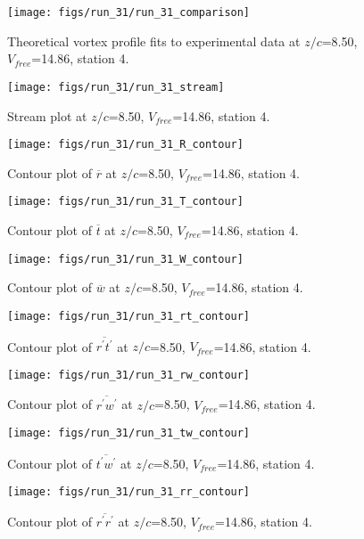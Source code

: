 \begin{figure}[H]
\centering
\texttt{[image: figs/run\_31/run\_31\_comparison]}
\caption{Theoretical vortex profile fits to experimental data at $z/c$=8.50, $V_{free}$=14.86, station 4.}
\end{figure}


\begin{figure}[H]
\centering
\texttt{[image: figs/run\_31/run\_31\_stream]}
\caption{Stream plot at $z/c$=8.50, $V_{free}$=14.86, station 4.}
\end{figure}


\begin{figure}[H]
\centering
\texttt{[image: figs/run\_31/run\_31\_R\_contour]}
\caption{Contour plot of $\overline{r}$ at $z/c$=8.50, $V_{free}$=14.86, station 4.}
\end{figure}


\begin{figure}[H]
\centering
\texttt{[image: figs/run\_31/run\_31\_T\_contour]}
\caption{Contour plot of $\overline{t}$ at $z/c$=8.50, $V_{free}$=14.86, station 4.}
\end{figure}


\begin{figure}[H]
\centering
\texttt{[image: figs/run\_31/run\_31\_W\_contour]}
\caption{Contour plot of $\overline{w}$ at $z/c$=8.50, $V_{free}$=14.86, station 4.}
\end{figure}


\begin{figure}[H]
\centering
\texttt{[image: figs/run\_31/run\_31\_rt\_contour]}
\caption{Contour plot of $\overline{r^\prime t^\prime}$ at $z/c$=8.50, $V_{free}$=14.86, station 4.}
\end{figure}


\begin{figure}[H]
\centering
\texttt{[image: figs/run\_31/run\_31\_rw\_contour]}
\caption{Contour plot of $\overline{r^\prime w^\prime}$ at $z/c$=8.50, $V_{free}$=14.86, station 4.}
\end{figure}


\begin{figure}[H]
\centering
\texttt{[image: figs/run\_31/run\_31\_tw\_contour]}
\caption{Contour plot of $\overline{t^\prime w^\prime}$ at $z/c$=8.50, $V_{free}$=14.86, station 4.}
\end{figure}


\begin{figure}[H]
\centering
\texttt{[image: figs/run\_31/run\_31\_rr\_contour]}
\caption{Contour plot of $\overline{r^\prime r^\prime}$ at $z/c$=8.50, $V_{free}$=14.86, station 4.}
\end{figure}


